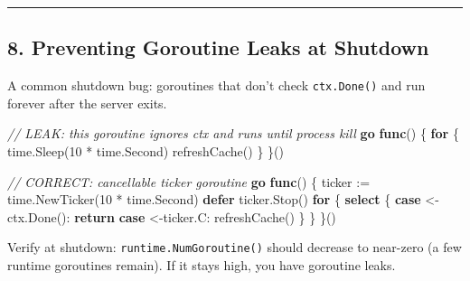 \documentclass[
]{article}
\newenvironment{Shaded}{}{}
\newcommand{\CommentTok}[1]{\textcolor[rgb]{0.38,0.63,0.69}{\textit{#1}}}
\newcommand{\ControlFlowTok}[1]{\textcolor[rgb]{0.00,0.44,0.13}{\textbf{#1}}}
\newcommand{\DecValTok}[1]{\textcolor[rgb]{0.25,0.63,0.44}{#1}}
\newcommand{\KeywordTok}[1]{\textcolor[rgb]{0.00,0.44,0.13}{\textbf{#1}}}
\newcommand{\NormalTok}[1]{#1}
\newcommand{\OperatorTok}[1]{\textcolor[rgb]{0.40,0.40,0.40}{#1}}
\begin{document}
\begin{center}\rule{0.5\linewidth}{0.5pt}\end{center}

\hypertarget{preventing-goroutine-leaks-at-shutdown}{%
\subsection{8. Preventing Goroutine Leaks at
Shutdown}\label{preventing-goroutine-leaks-at-shutdown}}

A common shutdown bug: goroutines that don't check \texttt{ctx.Done()}
and run forever after the server exits.

\begin{Shaded}
\begin{Highlighting}[]
\CommentTok{// LEAK: this goroutine ignores ctx and runs until process kill}
\ControlFlowTok{go} \KeywordTok{func}\OperatorTok{()} \OperatorTok{\{}
    \ControlFlowTok{for} \OperatorTok{\{}
\NormalTok{        time}\OperatorTok{.}\NormalTok{Sleep}\OperatorTok{(}\DecValTok{10} \OperatorTok{*}\NormalTok{ time}\OperatorTok{.}\NormalTok{Second}\OperatorTok{)}
\NormalTok{        refreshCache}\OperatorTok{()}
    \OperatorTok{\}}
\OperatorTok{\}()}

\CommentTok{// CORRECT: cancellable ticker goroutine}
\ControlFlowTok{go} \KeywordTok{func}\OperatorTok{()} \OperatorTok{\{}
\NormalTok{    ticker }\OperatorTok{:=}\NormalTok{ time}\OperatorTok{.}\NormalTok{NewTicker}\OperatorTok{(}\DecValTok{10} \OperatorTok{*}\NormalTok{ time}\OperatorTok{.}\NormalTok{Second}\OperatorTok{)}
    \ControlFlowTok{defer}\NormalTok{ ticker}\OperatorTok{.}\NormalTok{Stop}\OperatorTok{()}
    \ControlFlowTok{for} \OperatorTok{\{}
        \ControlFlowTok{select} \OperatorTok{\{}
        \ControlFlowTok{case} \OperatorTok{\textless{}{-}}\NormalTok{ctx}\OperatorTok{.}\NormalTok{Done}\OperatorTok{():}
            \ControlFlowTok{return}
        \ControlFlowTok{case} \OperatorTok{\textless{}{-}}\NormalTok{ticker}\OperatorTok{.}\NormalTok{C}\OperatorTok{:}
\NormalTok{            refreshCache}\OperatorTok{()}
        \OperatorTok{\}}
    \OperatorTok{\}}
\OperatorTok{\}()}
\end{Highlighting}
\end{Shaded}

Verify at shutdown: \texttt{runtime.NumGoroutine()} should decrease to
near-zero (a few runtime goroutines remain). If it stays high, you have
goroutine leaks.
\end{document}

